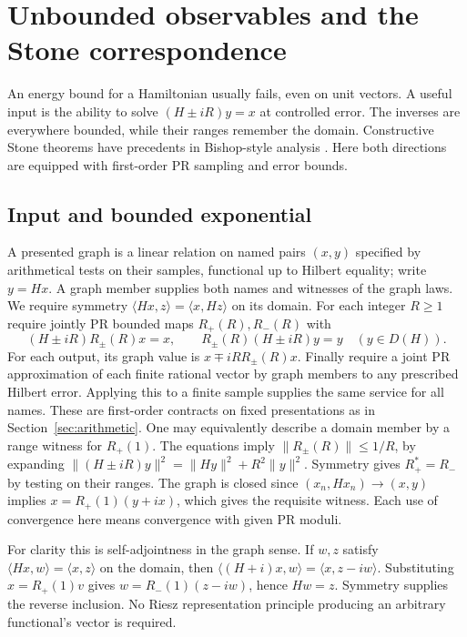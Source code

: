 \section{Unbounded observables and the Stone correspondence}\label{sec:stone}
An energy bound for a Hamiltonian usually fails, even on unit vectors. A useful input is the ability to solve $(H\pm iR)y=x$ at controlled error. The inverses are everywhere bounded, while their ranges remember the domain. Constructive Stone theorems have precedents in Bishop-style analysis \cite{ye}. Here both directions are equipped with first-order PR sampling and error bounds.

\subsection{Input and bounded exponential}
A presented graph is a linear relation on named pairs $(x,y)$ specified by arithmetical tests on their samples, functional up to Hilbert equality; write $y=Hx$. A graph member supplies both names and witnesses of the graph laws. We require symmetry $\langle Hx,z\rangle=\langle x,Hz\rangle$ on its domain. For each integer $R\ge1$ require jointly PR bounded maps $R_+(R),R_-(R)$ with
\[
 (H\pm iR)R_\pm(R)x=x,\qquad R_\pm(R)(H\pm iR)y=y\quad(y\in D(H)).
\]
For each output, its graph value is $x\mp iR R_\pm(R)x$. Finally require a joint PR approximation of each finite rational vector by graph members to any prescribed Hilbert error. Applying this to a finite sample supplies the same service for all names. These are first-order contracts on fixed presentations as in Section~\ref{sec:arithmetic}. One may equivalently describe a domain member by a range witness for $R_+(1)$. The equations imply $\|R_\pm(R)\|\le1/R$, by expanding $\|(H\pm iR)y\|^2=\|Hy\|^2+R^2\|y\|^2$. Symmetry gives $R_+^*=R_-$ by testing on their ranges. The graph is closed since $(x_n,Hx_n)\to(x,y)$ implies $x=R_+(1)(y+ix)$, which gives the requisite witness. Each use of convergence here means convergence with given PR moduli.

For clarity this is self-adjointness in the graph sense. If $w,z$ satisfy $\langle Hx,w\rangle=\langle x,z\rangle$ on the domain, then $\langle (H+i)x,w\rangle=\langle x,z-iw\rangle$. Substituting $x=R_+(1)v$ gives $w=R_-(1)(z-iw)$, hence $Hw=z$. Symmetry supplies the reverse inclusion. No Riesz representation principle producing an arbitrary functional's vector is required.

